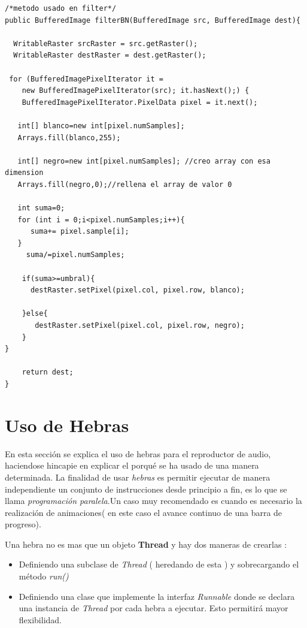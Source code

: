 \begin{lstlisting}
/*metodo usado en filter*/
public BufferedImage filterBN(BufferedImage src, BufferedImage dest){
     
  WritableRaster srcRaster = src.getRaster();
  WritableRaster destRaster = dest.getRaster();
        
 for (BufferedImagePixelIterator it = 
    new BufferedImagePixelIterator(src); it.hasNext();) {
    BufferedImagePixelIterator.PixelData pixel = it.next();
           
   int[] blanco=new int[pixel.numSamples];
   Arrays.fill(blanco,255);
            
   int[] negro=new int[pixel.numSamples]; //creo array con esa dimension
   Arrays.fill(negro,0);//rellena el array de valor 0
            
   int suma=0;
   for (int i = 0;i<pixel.numSamples;i++){
      suma+= pixel.sample[i];
   }
     suma/=pixel.numSamples;
            
    if(suma>=umbral){
      destRaster.setPixel(pixel.col, pixel.row, blanco);
               
    }else{
       destRaster.setPixel(pixel.col, pixel.row, negro);
    }   
}
        
    return dest;
}
\end{lstlisting}


\section{Uso de Hebras}
En esta sección se explica el uso de hebras para el reproductor de audio, haciendose hincapie en explicar el porqué se ha usado de una manera determinada. 
La finalidad de usar \emph{hebras} es permitir ejecutar de manera independiente un conjunto de instrucciones desde principio a fin, es lo que se llama \emph{programación paralela}.Un caso muy recomendado es cuando es necesario la realización de animaciones( en este caso el avance continuo de una barra de progreso).

Una hebra no es mas que un objeto \textbf{Thread} y hay dos maneras de crearlas \cite{ApuntesSCD}:

\begin{itemize}
\item Definiendo una subclase de \emph{Thread} \cite{hebras} ( heredando de esta ) y sobrecargando el método \emph{run()}
\item Definiendo una clase que implemente la interfaz \emph{Runnable} donde se declara una instancia de \emph{Thread} por cada hebra a ejecutar. Esto permitirá mayor flexibilidad.
\end{itemize}

